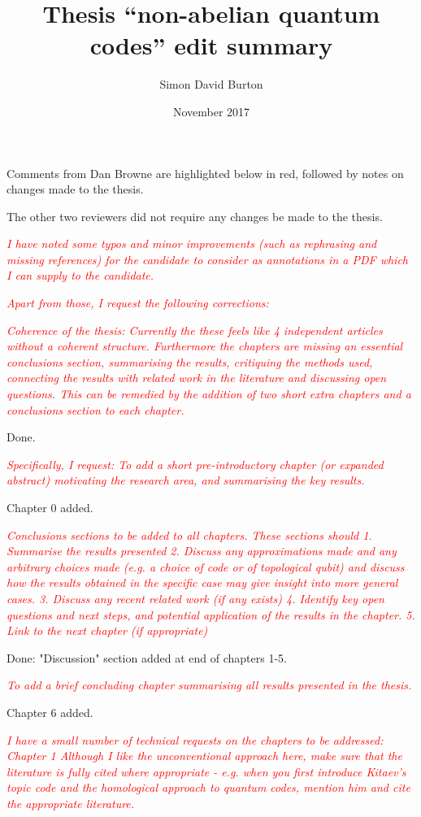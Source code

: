 \documentclass[11pt,oneside]{article}
\title{Thesis ``non-abelian quantum codes'' edit summary}
\author{Simon David Burton}
\date{November 2017}
\newcommand{\danbrowne}[1]{\vspace{10pt}\noindent\textcolor{red}{{\it #1}}}
\begin{document}
\maketitle

Comments from Dan Browne are highlighted below in red, followed by 
notes on changes made to the thesis.

The other two reviewers did not require any changes be made to the thesis.

\danbrowne{
I have noted some typos and minor improvements (such as rephrasing and missing references) for the candidate to consider as
annotations in a PDF which I can supply to the candidate.
}


\danbrowne{
Apart from those, I request the following corrections:
}

\danbrowne{
Coherence of the thesis:
Currently the these feels like 4 independent articles without a coherent structure. Furthermore the chapters are missing an
essential conclusions section, summarising the results, critiquing the methods used, connecting the results with related work in the
literature and discussing open questions. This can be remedied by the addition of two short extra chapters and a conclusions
section to each chapter.
}

Done.

\danbrowne{
Specifically, I request:
To add a short pre-introductory chapter (or expanded abstract) motivating the research area, and summarising the key results.
}

Chapter 0 added.

\danbrowne{
Conclusions sections to be added to all chapters. These sections should
1. Summarise the results presented
2. Discuss any approximations made and any arbitrary choices made (e.g. a choice of code or of topological qubit) and
discuss how the results obtained in the specific case may give insight into more general cases.
3. Discuss any recent related work (if any exists)
4. Identify key open questions and next steps, and potential application of the results in the chapter.
5. Link to the next chapter (if appropriate)
}

Done: "Discussion" section added at end of chapters 1-5.

\danbrowne{
To add a brief concluding chapter summarising all results presented in the thesis.
}

Chapter 6 added.

\danbrowne{
I have a small number of technical requests on the chapters to be addressed:
Chapter 1
Although I like the unconventional approach here, make sure that the literature is fully cited where appropriate - e.g. when you first
introduce Kitaev’s topic code and the homological approach to quantum codes, mention him and cite the appropriate literature.
}
\end{document}
